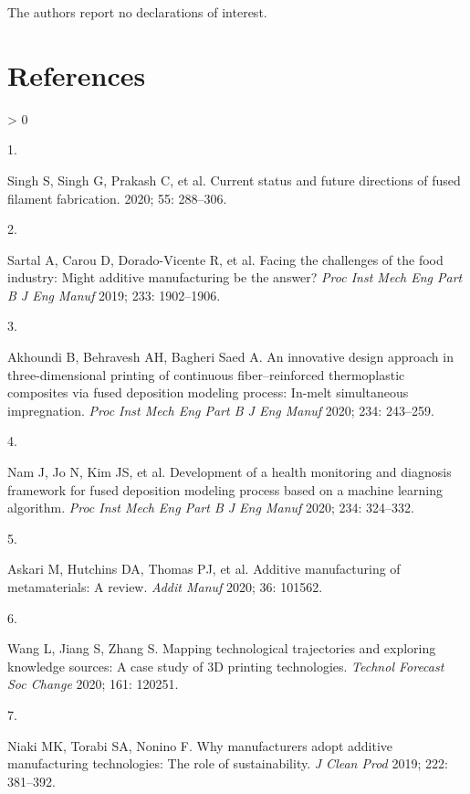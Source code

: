 \documentclass[
  12pt]{article}
\newlength{\cslhangindent}
\newlength{\csllabelwidth}
\newenvironment{CSLReferences}[2] %
 {%
  \setlength{\parindent}{0pt}
  \ifodd #1 \everypar{\setlength{\hangindent}{\cslhangindent}}\ignorespaces\fi
  \ifnum #2 > 0
  \setlength{\parskip}{#2\baselineskip}
  \fi
 }%
 {}
\newcommand{\CSLLeftMargin}[1]{\parbox[t]{\csllabelwidth}{#1}}
\newcommand{\CSLRightInline}[1]{\parbox[t]{\linewidth - \csllabelwidth}{#1}\break}
\begin{document}
The authors report no declarations of interest.

\newpage

\hypertarget{references}{%
\section*{References}\label{references}}

\hypertarget{refs}{}
\begin{CSLReferences}{0}{0}
\leavevmode\hypertarget{ref-Singh2020d}{}%
\CSLLeftMargin{1. }
\CSLRightInline{Singh S, Singh G, Prakash C, et al. {Current status and future directions of fused filament fabrication}. 2020; 55: 288--306.}

\leavevmode\hypertarget{ref-Sartal2018}{}%
\CSLLeftMargin{2. }
\CSLRightInline{Sartal A, Carou D, Dorado-Vicente R, et al. {Facing the challenges of the food industry: Might additive manufacturing be the answer?} \emph{Proc Inst Mech Eng Part B J Eng Manuf} 2019; 233: 1902--1906.}

\leavevmode\hypertarget{ref-Akhoundi2019}{}%
\CSLLeftMargin{3. }
\CSLRightInline{Akhoundi B, Behravesh AH, Bagheri Saed A. {An innovative design approach in three-dimensional printing of continuous fiber--reinforced thermoplastic composites via fused deposition modeling process: In-melt simultaneous impregnation}. \emph{Proc Inst Mech Eng Part B J Eng Manuf} 2020; 234: 243--259.}

\leavevmode\hypertarget{ref-Nam2019}{}%
\CSLLeftMargin{4. }
\CSLRightInline{Nam J, Jo N, Kim JS, et al. {Development of a health monitoring and diagnosis framework for fused deposition modeling process based on a machine learning algorithm}. \emph{Proc Inst Mech Eng Part B J Eng Manuf} 2020; 234: 324--332.}

\leavevmode\hypertarget{ref-Askari2020}{}%
\CSLLeftMargin{5. }
\CSLRightInline{Askari M, Hutchins DA, Thomas PJ, et al. {Additive manufacturing of metamaterials: A review}. \emph{Addit Manuf} 2020; 36: 101562.}

\leavevmode\hypertarget{ref-Wang2020f}{}%
\CSLLeftMargin{6. }
\CSLRightInline{Wang L, Jiang S, Zhang S. {Mapping technological trajectories and exploring knowledge sources: A case study of 3D printing technologies}. \emph{Technol Forecast Soc Change} 2020; 161: 120251.}

\leavevmode\hypertarget{ref-Niaki2019}{}%
\CSLLeftMargin{7. }
\CSLRightInline{Niaki MK, Torabi SA, Nonino F. {Why manufacturers adopt additive manufacturing technologies: The role of sustainability}. \emph{J Clean Prod} 2019; 222: 381--392.}


\end{CSLReferences}
\end{document}
